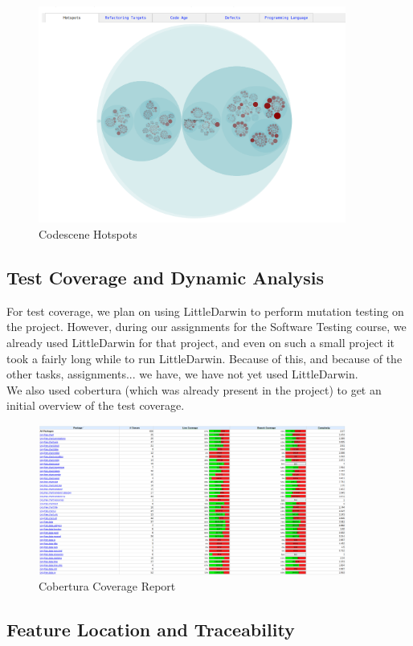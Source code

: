 \documentclass{article}
\begin{document}
\begin{figure}[H]
\centering
	\includegraphics[width=0.9\textwidth]{codescene_hotspots.png}
	\caption{Codescene Hotspots}
\end{figure}

\subsection{Test Coverage and Dynamic Analysis}

For test coverage, we plan on using LittleDarwin to perform mutation testing on the project. However, during our assignments for the Software Testing course, we already used LittleDarwin for that project, and even on such a small project it took a fairly long while to run LittleDarwin. Because of this, and because of the other tasks, assignments... we have, we have not yet used LittleDarwin.\\

We also used cobertura (which was already present in the project) to get an initial overview of the test coverage.

\begin{figure}[H]
\centering
	\includegraphics[width=0.9\textwidth]{cobertura_coverage.png}
	\caption{Cobertura Coverage Report}
\end{figure}

\subsection{Feature Location and Traceability}
\end{document}
